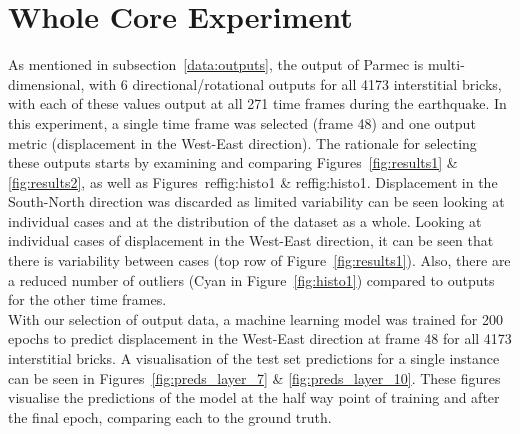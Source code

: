 \section{Whole Core Experiment} \label{prelim:whole}

As mentioned in subsection~\ref{data:outputs}, the output of Parmec is multi-dimensional, with 6 directional/rotational outputs for all 4173 interstitial bricks, with each of these values output at all 271 time frames during the earthquake. In this experiment, a single time frame was selected (frame 48) and one output metric (displacement in the West-East direction). The rationale for selecting these outputs starts by examining and comparing Figures~\ref{fig:results1} \& \ref{fig:results2}, as well as Figures~ref{fig:histo1} \& ref{fig:histo1}. Displacement in the South-North direction was discarded as limited variability can be seen looking at individual cases and at the distribution of the dataset as a whole. Looking at individual cases of displacement in the West-East direction, it can be seen that there is variability between cases (top row of Figure~\ref{fig:results1}). Also, there are a reduced number of outliers (Cyan in Figure~\ref{fig:histo1}) compared to outputs for the other time frames. 
\\

\noindent
With our selection of output data, a machine learning model was trained for 200 epochs to predict displacement in the West-East direction at frame 48 for all 4173 interstitial bricks. A visualisation of the test set predictions for a single instance can be seen in Figures~\ref{fig:preds_layer_7} \& \ref{fig:preds_layer_10}. These figures visualise the predictions of the model at the half way point of training and after the final epoch, comparing each to the ground truth.
\\

